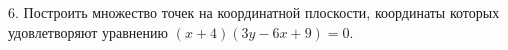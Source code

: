 6. Построить множество точек на координатной плоскости, координаты которых удовлетворяют уравнению $(x+4)(3y-6x+9)=0.$\\
